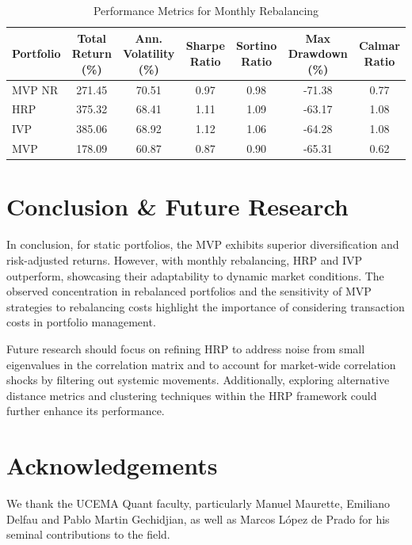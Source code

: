 \documentclass[english]{maciarticle}
\begin{document}
\vspace{-0.5cm}

\begin{table}[H]
    \centering
    \renewcommand{\arraystretch}{1.1}
    \small %
    \caption{Performance Metrics for Monthly Rebalancing}
    \begin{tabular}{|l|c|c|c|c|c|c|}
    \hline
    Portfolio & Total Return (\%) & Ann. Volatility (\%) & Sharpe Ratio & Sortino Ratio & Max Drawdown (\%) & Calmar Ratio \\
    \hline
    MVP NR & 271.45 & 70.51 & 0.97 & 0.98 & -71.38 & 0.77 \\
    HRP & 375.32 & 68.41 & 1.11 & 1.09 & -63.17 & 1.08 \\
    IVP & 385.06 & 68.92 & 1.12 & 1.06 & -64.28 & 1.08 \\
    MVP & 178.09 & 60.87 & 0.87 & 0.90 & -65.31 & 0.62 \\
    \hline
    \end{tabular}
\end{table}

\section{Conclusion \& Future Research}

In conclusion, for static portfolios, the MVP exhibits superior diversification and risk-adjusted returns. However, with monthly rebalancing, HRP and IVP outperform, showcasing their adaptability to dynamic market conditions. The observed concentration in rebalanced portfolios and the sensitivity of MVP strategies to rebalancing costs highlight the importance of considering transaction costs in portfolio management.

Future research should focus on refining HRP to address noise from small eigenvalues in the correlation matrix and to account for market-wide correlation shocks by filtering out systemic movements. Additionally, exploring alternative distance metrics and clustering techniques within the HRP framework could further enhance its performance.

\section*{Acknowledgements}

We thank the UCEMA Quant faculty, particularly Manuel Maurette, Emiliano Delfau and Pablo Martin Gechidjian, as well as Marcos López de Prado for his seminal contributions to the field.
\end{document}
